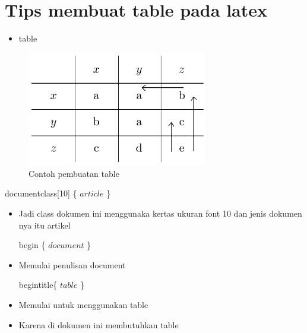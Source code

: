 \section{Tips membuat table pada latex}
\begin{itemize}
	\item table
\end{itemize}
\begin{figure}[ht]
	\centerline{\includegraphics[width=0.70\textwidth]{gambar/isal2}}
	\caption{Contoh pembuatan table}
	\label{table latex}
\end{figure}

\noindent documentclass[10] \{ $article$ \} \par

\begin{itemize}
	\vspace{\baselineskip}
	\vspace{\baselineskip}
	\item Jadi class dokumen ini menggunaka kertas ukuran font 10 dan jenis dokumen nya itu artikel\par
\vspace{\baselineskip}
begin \{ $document$ \} \par
\vspace{\baselineskip}
	\item Memulai penulisan document\par
\vspace{\baselineskip}
begintitle\{ $table$ \} \par
\vspace{\baselineskip}
	\item Memulai untuk menggunakan table\par
\vspace{\baselineskip}
	\item Karena di dokumen ini membutuhkan table
	\vspace{\baselineskip}
\end{itemize}\par


